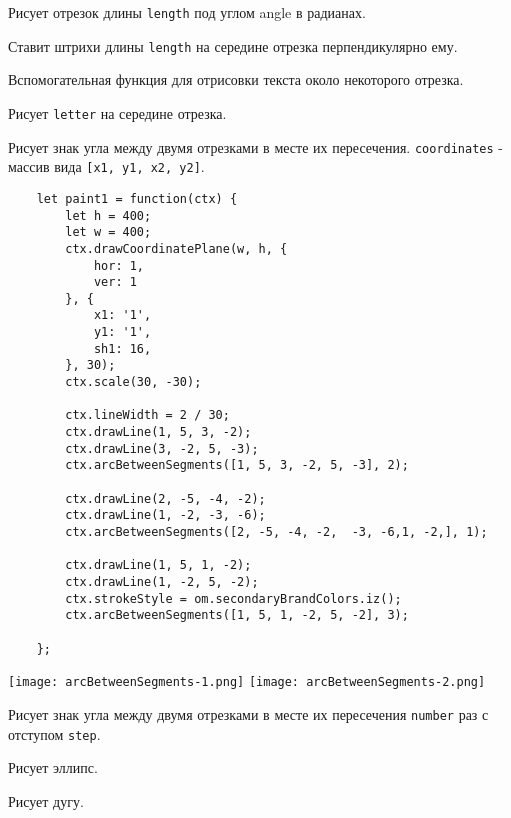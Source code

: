 Рисует отрезок длины \texttt{length} под углом angle в радианах.

Ставит штрихи длины \texttt{length} на середине отрезка перпендикулярно ему.

Вспомогательная функция для отрисовки текста около некоторого отрезка.

Рисует \texttt{letter} на середине отрезка.

Рисует знак угла между двумя отрезками в месте их пересечения. \texttt{coordinates} - массив вида \texttt{[x1, y1, x2, y2]}.

\begin{lstlisting}
    let paint1 = function(ctx) {
        let h = 400;
        let w = 400;
        ctx.drawCoordinatePlane(w, h, {
            hor: 1,
            ver: 1
        }, {
            x1: '1',
            y1: '1',
            sh1: 16,
        }, 30);
        ctx.scale(30, -30);

        ctx.lineWidth = 2 / 30;
        ctx.drawLine(1, 5, 3, -2);
        ctx.drawLine(3, -2, 5, -3);
        ctx.arcBetweenSegments([1, 5, 3, -2, 5, -3], 2);

        ctx.drawLine(2, -5, -4, -2);
        ctx.drawLine(1, -2, -3, -6);
        ctx.arcBetweenSegments([2, -5, -4, -2,  -3, -6,1, -2,], 1);

        ctx.drawLine(1, 5, 1, -2);
		ctx.drawLine(1, -2, 5, -2);
		ctx.strokeStyle = om.secondaryBrandColors.iz();
		ctx.arcBetweenSegments([1, 5, 1, -2, 5, -2], 3);

    };
\end{lstlisting}

\texttt{[image: arcBetweenSegments-1.png]}    
\texttt{[image: arcBetweenSegments-2.png]}    

Рисует знак угла между двумя отрезками в месте их пересечения \texttt{number} раз с отступом \texttt{step}.

Рисует эллипс.

Рисует дугу.

